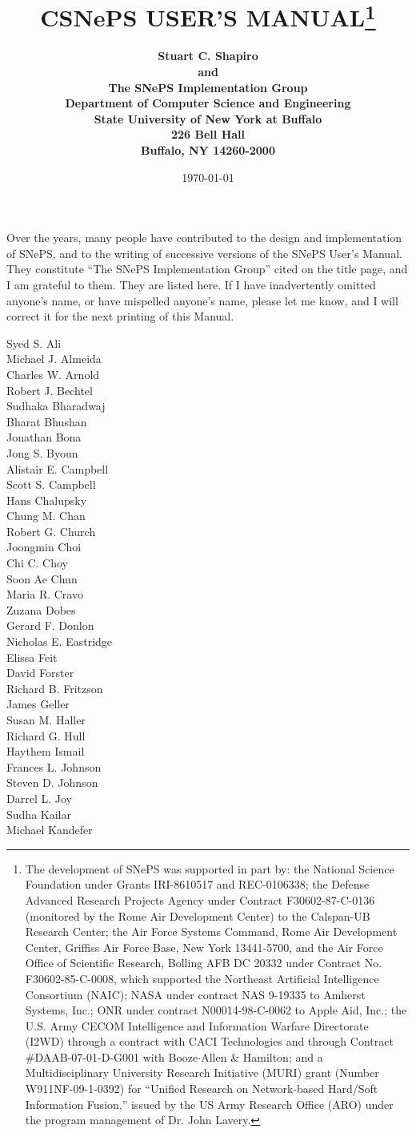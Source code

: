 \documentclass[letterpaper,colorlinks=true,linkcolor=blue]{book}
\title{\bf CSNePS USER'S MANUAL\thanks{The development of SNePS was supported
    in part by: the National Science Foundation under Grants IRI-8610517 and
    REC-0106338; the Defense Advanced Research Projects Agency under Contract
    F30602-87-C-0136 (monitored by the Rome Air Development Center) to the
    Calspan-UB Research Center; the Air Force Systems Command, Rome Air
    Development Center, Griffiss Air Force Base, New York 13441-5700, and the
    Air Force Office of Scientific Research, Bolling AFB DC 20332 under Contract
    No.  F30602-85-C-0008, which supported the Northeast Artificial Intelligence
    Consortium (NAIC); NASA under contract NAS 9-19335 to Amherst Systems, Inc.;
    ONR under contract N00014-98-C-0062 to Apple Aid, Inc.; the U.S. Army CECOM
    Intelligence and Information Warfare Directorate (I2WD) through a contract
    with CACI Technologies and through Contract \#DAAB-07-01-D-G001 with
    Booze$\cdot$Allen \& Hamilton; and a Multidisciplinary University Research
    Initiative (MURI) grant (Number W911NF-09-1-0392) for ``Unified Research on
    Network-based Hard/Soft Information Fusion,'' issued by the US Army Research
    Office (ARO) under the program management of Dr. John Lavery.}}
\author{ \bf
Stuart C. Shapiro \\ \bf
and \\ \bf
The SNePS Implementation Group \\[2ex] \bf
Department of Computer Science and Engineering\\ \bf
State University of New York at Buffalo \\ \bf
226 Bell Hall\\ \bf
Buffalo, NY 14260-2000 \\[2ex] \bf
\date{\today}}
\begin{document}
\frontmatter
\maketitle

\pagebreak
Over the years, many people have contributed to the design and
implementation of SNePS, and to the writing of successive versions of
the SNePS User's Manual.  They constitute ``The SNePS Implementation
Group'' cited on the title page, and I am grateful to them.  They are
listed here.  If I have inadvertently omitted anyone's name, or have
mispelled anyone's name, please let me know, and I will correct it for
the next printing of this Manual.
\begin{multicols}{3}
\noindent Syed S. Ali\\
Michael J. Almeida\\
Charles W. Arnold\\
Robert J. Bechtel\\
Sudhaka Bharadwaj\\
Bharat Bhushan\\
Jonathan Bona\\
Jong S. Byoun\\
Alistair E. Campbell\\
Scott S. Campbell\\
Hans Chalupsky\\
Chung M. Chan\\
Robert G. Church\\
Joongmin Choi\\
Chi C. Choy\\
Soon Ae Chun\\
Maria R. Cravo\\
Zuzana Dobes\\
Gerard F. Donlon\\
Nicholas E. Eastridge\\
Elissa Feit\\
David Forster\\
Richard B. Fritzson\\
James Geller\\
Susan M. Haller\\
Richard G. Hull\\
Haythem Ismail\\
Frances L. Johnson\\
Steven D. Johnson\\
Darrel L. Joy\\
Sudha Kailar\\
Michael Kandefer\\

\end{multicols}
\end{document}
